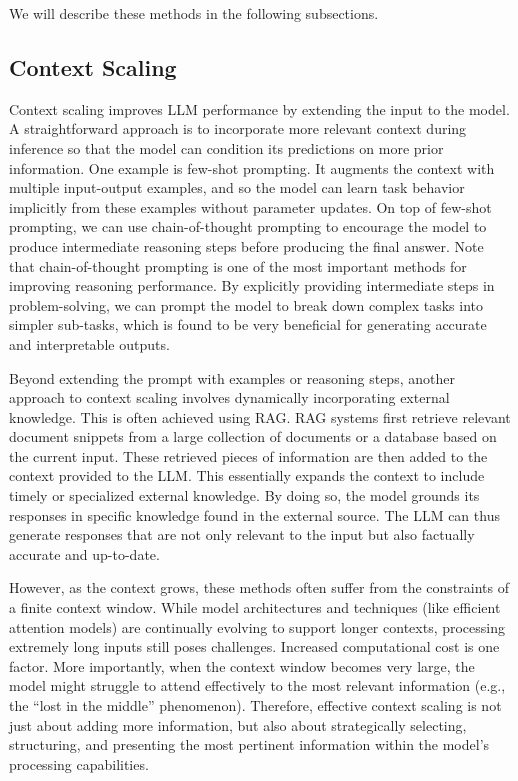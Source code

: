 We will describe these methods in the following subsections.

\subsection{Context Scaling}

Context scaling improves LLM performance by extending the input to the model. A straightforward approach is to incorporate more relevant context during inference so that the model can condition its predictions on more prior information. One example is few-shot prompting. It augments the context with multiple input-output examples, and so the model can learn task behavior implicitly from these examples without parameter updates. On top of few-shot prompting, we can use chain-of-thought prompting to encourage the model to produce intermediate reasoning steps before producing the final answer. Note that chain-of-thought prompting is one of the most important methods for improving reasoning performance. By explicitly providing intermediate steps in problem-solving, we can prompt the model to break down complex tasks into simpler sub-tasks, which is found to be very beneficial for generating accurate and interpretable outputs.

Beyond extending the prompt with examples or reasoning steps, another approach to context scaling involves dynamically incorporating external knowledge. This is often achieved using RAG. RAG systems first retrieve relevant document snippets from a large collection of documents or a database based on the current input. These retrieved pieces of information are then added to the context provided to the LLM. This essentially expands the context to include timely or specialized external knowledge. By doing so, the model grounds its responses in specific knowledge found in the external source. The LLM can thus generate responses that are not only relevant to the input but also factually accurate and up-to-date.

However, as the context grows, these methods often suffer from the constraints of a finite context window. While model architectures and techniques (like efficient attention models) are continually evolving to support longer contexts, processing extremely long inputs still poses challenges. Increased computational cost is one factor. More importantly, when the context window becomes very large, the model might struggle to attend effectively to the most relevant information (e.g., the ``lost in the middle'' phenomenon). Therefore, effective context scaling is not just about adding more information, but also about strategically selecting, structuring, and presenting the most pertinent information within the model's processing capabilities.

